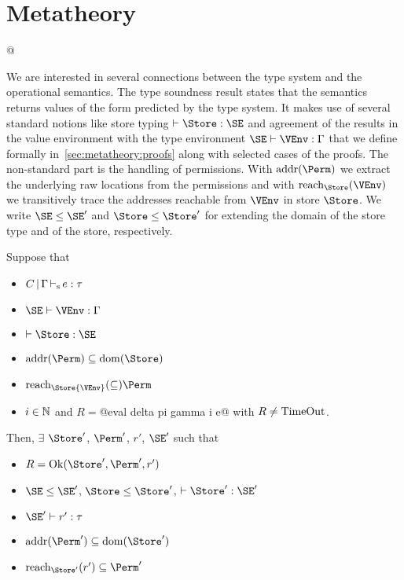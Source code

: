 \clearpage{}
\section{Metatheory}
\label{sec:metatheory}

\lstMakeShortInline[style=rule]@

We are interested in several connections between the type system and
the operational semantics. The type soundness result states
that the semantics returns values of the form predicted by the type
system. It makes use of several standard notions like store typing
$\vdash \Store : \SE$ and agreement of the results in the value environment
with the type environment $\SE \vdash \VEnv:\E$ that we define
formally in~\cref{sec:metatheory:proofs} along with selected cases of the proofs. The
non-standard part is the handling of permissions. With
$\Addresses\Perm$ we extract the underlying raw locations from the
permissions and with $\Reach\Store\VEnv$ we transitively trace the
addresses reachable from $\VEnv$ in store $\Store$. We write
$\SE\le\SE'$ and $\Store \le \Store'$ for extending the domain of the
store type and of the store, respectively.

\begin{theorem}\label{theorem:type-soundness}
  Suppose that
  \begin{itemize}
  \item $C \operatorname{|} \Gamma \operatorname{\vdash_s} e : \tau$
  \item $\SE \vdash \VEnv : \E$
  \item $\vdash \Store : \SE$
  \item $\Addresses\Perm \subseteq \Dom\Store$
  \item $\Reach\Store{\VEnv} \subseteq \Perm$
  \item  $i\in\mathbb{N}$ and
    $R = $@eval delta pi gamma i e@
    with $R\ne \operatorname{TimeOut}$.
  \end{itemize}
  Then,
  $\exists$ $\Store'$, $\Perm'$, $r'$, $\SE'$ such that
  \begin{itemize}
  \item
    $R = \Ok{\Store', \Perm', r'}$  
  \item $\SE \le \SE'$, $\Store \le \Store'$,
    $\vdash \Store' : \SE'$ 
  \item $\SE' \vdash r' : \tau$
  \item $\Addresses{\Perm'} \subseteq \Dom{\Store'}$
  \item $\Reach{\Store'}{r'} \subseteq \Perm'$
  \end{itemize}
\end{theorem}

